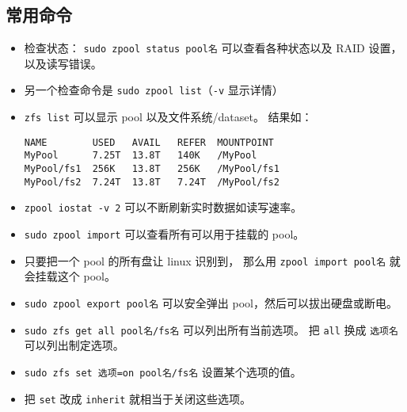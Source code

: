 \subsection{常用命令}
\begin{itemize}
\item 检查状态： \verb|sudo zpool status pool名| 可以查看各种状态以及 RAID 设置， 以及读写错误。
\item 另一个检查命令是 \verb|sudo zpool list|（\verb|-v| 显示详情）
\item \verb`zfs list` 可以显示 pool 以及文件系统/dataset。 结果如：
\begin{lstlisting}[language=none]
NAME        USED   AVAIL   REFER  MOUNTPOINT
MyPool      7.25T  13.8T   140K   /MyPool
MyPool/fs1  256K   13.8T   256K   /MyPool/fs1
MyPool/fs2  7.24T  13.8T   7.24T  /MyPool/fs2
\end{lstlisting}
\item \verb|zpool iostat -v 2| 可以不断刷新实时数据如读写速率。
\item \verb|sudo zpool import| 可以查看所有可以用于挂载的 pool。
\item 只要把一个 pool 的所有盘让 linux 识别到， 那么用 \verb|zpool import pool名| 就会挂载这个 pool。
\item \verb|sudo zpool export pool名| 可以安全弹出 pool，然后可以拔出硬盘或断电。
\item \verb|sudo zfs get all pool名/fs名| 可以列出所有当前选项。 把 \verb|all| 换成 \verb|选项名| 可以列出制定选项。
\item \verb|sudo zfs set 选项=on pool名/fs名| 设置某个选项的值。
\item 把 \verb|set| 改成 \verb|inherit| 就相当于关闭这些选项。
\end{itemize}


